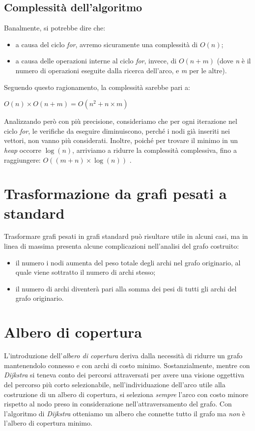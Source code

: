 \subsection{Complessità dell'algoritmo}
Banalmente, si potrebbe dire che:
\begin{itemize}
    \item a causa del ciclo \textit{for}, avremo sicuramente una complessità di $O(n)$;
    \item a causa delle operazioni interne al ciclo \textit{for}, invece, di $O(n+m)$ (dove \textit{n} è il numero di operazioni eseguite dalla ricerca dell'arco, e \textit{m} per le altre).
\end{itemize}
Seguendo questo ragionamento, la complessità sarebbe pari a:
\begin{center}
    $ O(n)\times O(n+m) = O(n^2 + n\times m) $
\end{center}
Analizzando però con più precisione, consideriamo che per ogni iterazione nel ciclo \textit{for}, le verifiche da eseguire diminuiscono, perché i nodi già inseriti nei vettori, non vanno più considerati. Inoltre, poiché per trovare il minimo in un \textit{heap} occorre $\log(n)$, arriviamo a ridurre la complessità complessiva, fino a raggiungere: $O((m+n)\times \log(n))$ .

\section{Trasformazione da grafi pesati a standard}
Trasformare grafi pesati in grafi standard può risultare utile in alcuni casi, ma in linea di massima presenta alcune complicazioni nell'analisi del grafo costruito:
\begin{itemize}
    \item il numero i nodi aumenta del peso totale degli archi nel grafo originario, al quale viene sottratto il numero di archi stesso;
    \item il numero di archi diventerà pari alla somma dei pesi di tutti gli archi del grafo originario.
\end{itemize}
\newpage

\section{Albero di copertura}
L'introduzione dell'\textit{albero di copertura} deriva dalla necessità di ridurre un grafo mantenendolo connesso e con archi di costo minimo. Sostanzialmente, mentre con \textit{Dijkstra} si teneva conto dei percorsi attraversati per avere una visione oggettiva del percorso più corto selezionabile, nell'individuazione dell'arco utile alla costruzione di un albero di copertura, si seleziona \textit{sempre} l'arco con costo minore rispetto al nodo preso in considerazione nell'attraversamento del grafo.
Con l'algoritmo di \textit{Dijkstra} otteniamo un albero che connette tutto il grafo ma \textit{non} è l'albero di copertura minimo. \\

